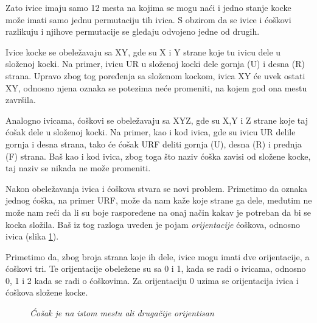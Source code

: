 \documentclass[a4paper]{article}
\begin{document}
Zato ivice imaju samo 12 mesta na kojima se mogu naći i jedno stanje kocke može imati samo jednu permutaciju tih ivica. S obzirom da se ivice i ćoškovi razlikuju i njihove permutacije se gledaju odvojeno jedne od drugih.

Ivice kocke se obeležavaju sa XY, gde su X i Y strane koje tu ivicu dele u složenoj kocki. Na primer, ivicu UR u složenoj kocki dele gornja (U) i desna (R) strana. Upravo zbog tog poređenja sa složenom kockom, ivica XY će uvek ostati XY, odnosno njena oznaka se potezima neće promeniti, na kojem god ona mestu završila.

Analogno ivicama, ćoškovi se obeležavaju sa XYZ, gde su X,Y i Z strane koje taj ćošak dele u složenoj kocki. Na primer, kao i kod ivica, gde su ivicu UR delile gornja i desna strana, tako će ćošak URF deliti gornja (U), desna (R) i prednja (F) strana. Baš kao i kod ivica, zbog toga što naziv ćoška zavisi od složene kocke, taj naziv se nikada ne može promeniti.

Nakon obeležavanja ivica i ćoškova stvara se novi problem. Primetimo da oznaka jednog ćoška, na primer URF, može da nam kaže koje strane ga dele, međutim ne može nam reći da li su boje raspoređene na onaj način kakav je potreban da bi se kocka složila. Baš iz tog razloga uveden je pojam \emph{orijentacije} ćoškova, odnosno ivica (slika \ref{fig:cosak-orijentacija-primer}).

Primetimo da, zbog broja strana koje ih dele, ivice mogu imati dve orijentacije, a ćoškovi tri. Te orijentacije obeležene su sa 0 i 1, kada se radi o ivicama, odnosno 0, 1 i 2 kada se radi o ćoškovima. Za orijentaciju 0 uzima se orijentacija ivica i ćoškova složene kocke. 

\begin{figure}[h]
        \centering
        \caption{\emph{Ćošak je na istom mestu ali drugačije orijentisan}}
        \label{fig:cosak-orijentacija-primer}
    \end{figure}
\end{document}
